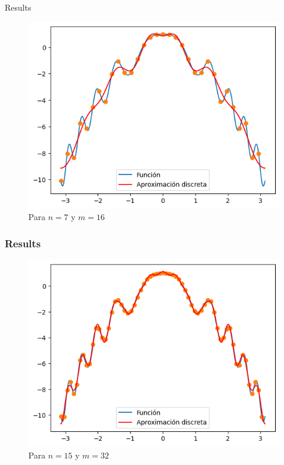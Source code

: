 \begin{frame}{Results}
    \begin{figure}
        \centering
        \includegraphics[width=.5\paperwidth]{p7-A-discreta2.png}
        \caption{Para $n=7$ y $m=16$}
        \label{fig:enter-label}
    \end{figure}
\end{frame}

\begin{frame}
    \frametitle{Results}

    \begin{figure}
        \centering
        \includegraphics[width=.5\paperwidth]{p7-A-discreta3.png}
        \caption{Para $n=15$ y $m=32$}
        \label{fig:enter-label}
    \end{figure}
\end{frame}